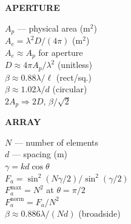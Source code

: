 \documentclass[6pt,letterpaper]{article}
\newcommand{\shead}[3]{%
  \noindent\colorbox{#1}{\parbox{\dimexpr\linewidth-2\fboxsep\relax}%
  {\color{#2}\bfseries\fontsize{6}{7}\selectfont #3}}\vspace{0.3pt}}
\begin{document}
\begin{minipage}[t]{0.19\linewidth}
\shead{tealbg}{teal}{APERTURE}
\begin{ebox}
$A_p$ --- physical area (m$^2$)\\
$A_e\!=\!\lambda^2 D/(4\pi)$ (m$^2$)\\
$A_e\!\approx\!A_p$ for aperture\\
$D\!\approx\!4\pi A_p/\lambda^2$ (unitless)\\
$\beta\!\approx\!0.88\lambda/\ell$ (rect/sq.)\\
$\beta\!\approx\!1.02\lambda/d$ (circular)\\
$2A_p\!\Rightarrow\!2D$, $\beta/\sqrt2$
\end{ebox}
\end{minipage}\hfill
\begin{minipage}[t]{0.19\linewidth}
\shead{amberbg}{amber}{ARRAY}
\begin{ebox}
$N$ --- number of elements\\
$d$ --- spacing (m)\\
$\gamma\!=\!kd\cos\theta$\\
$F_a\!=\!\sin^2(N\gamma/2)/\sin^2(\gamma/2)$\\
$F_a^{\max}\!=\!N^2$ at $\theta\!=\!\pi/2$\\
$F_a^\text{norm}\!=\!F_a/N^2$\\
$\beta\!\approx\!0.886\lambda/(Nd)$ (broadside)
\end{ebox}
\end{minipage}
\end{document}
